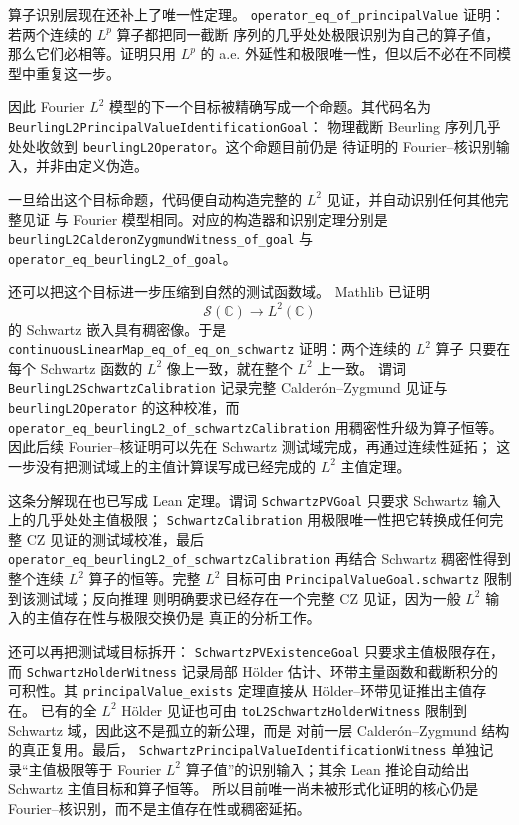\documentclass[UTF8,fontset=none,a4paper,11pt]{ctexart}
\begin{document}
算子识别层现在还补上了唯一性定理。
\texttt{operator\_eq\_of\_principalValue} 证明：若两个连续的 \(L^p\) 算子都把同一截断
序列的几乎处处极限识别为自己的算子值，那么它们必相等。证明只用 \(L^p\) 的 a.e.
外延性和极限唯一性，但以后不必在不同模型中重复这一步。\par

{\small
因此 Fourier \(L^2\) 模型的下一个目标被精确写成一个命题。其代码名为
\texttt{BeurlingL2PrincipalValue}\allowbreak\texttt{IdentificationGoal}：
物理截断 Beurling 序列几乎处处收敛到 \texttt{beurlingL2Operator}。这个命题目前仍是
待证明的 Fourier--核识别输入，并非由定义伪造。\par

一旦给出这个目标命题，代码便自动构造完整的 \(L^2\) 见证，并自动识别任何其他完整见证
与 Fourier 模型相同。对应的构造器和识别定理分别是
\texttt{beurlingL2CalderonZygmundWitness}\allowbreak\texttt{\_of\_goal} 与
\texttt{operator\_eq\_beurlingL2}\allowbreak\texttt{\_of\_goal}。\par
}

还可以把这个目标进一步压缩到自然的测试函数域。
Mathlib 已证明
\[
 \mathcal S(\mathbb C)\longrightarrow L^2(\mathbb C)
\]
的 Schwartz 嵌入具有稠密像。于是
\texttt{continuousLinearMap\_eq\_of\_eq\_on\_schwartz} 证明：两个连续的 \(L^2\) 算子
只要在每个 Schwartz 函数的 \(L^2\) 像上一致，就在整个 \(L^2\) 上一致。
谓词 \texttt{BeurlingL2SchwartzCalibration} 记录完整 Calderón--Zygmund 见证与
\texttt{beurlingL2Operator} 的这种校准，而
\texttt{operator\_eq\_beurlingL2\_of\_schwartzCalibration} 用稠密性升级为算子恒等。
因此后续 Fourier--核证明可以先在 Schwartz 测试域完成，再通过连续性延拓；
这一步没有把测试域上的主值计算误写成已经完成的 \(L^2\) 主值定理。\par

这条分解现在也已写成 Lean 定理。谓词
\texttt{SchwartzPVGoal} 只要求 Schwartz 输入上的几乎处处主值极限；
\texttt{SchwartzCalibration} 用极限唯一性把它转换成任何完整 CZ 见证的测试域校准，最后
\texttt{operator\_eq\_beurlingL2\_of\_schwartzCalibration} 再结合 Schwartz 稠密性得到
整个连续 \(L^2\) 算子的恒等。完整 \(L^2\) 目标可由
\texttt{PrincipalValueGoal.schwartz} 限制到该测试域；反向推理
则明确要求已经存在一个完整 CZ 见证，因为一般 \(L^2\) 输入的主值存在性与极限交换仍是
真正的分析工作。\par

还可以再把测试域目标拆开：
\texttt{SchwartzPVExistenceGoal} 只要求主值极限存在，
而 \texttt{SchwartzHolderWitness} 记录局部 Hölder 估计、环带主量函数和截断积分的
可积性。其 \texttt{principalValue\_exists} 定理直接从 Hölder--环带见证推出主值存在。
已有的全 $L^2$ Hölder 见证也可由
\texttt{toL2SchwartzHolderWitness} 限制到 Schwartz 域，因此这不是孤立的新公理，而是
对前一层 Calderón--Zygmund 结构的真正复用。最后，
\texttt{SchwartzPrincipalValueIdentificationWitness} 单独记录“主值极限等于
Fourier $L^2$ 算子值”的识别输入；其余 Lean 推论自动给出 Schwartz 主值目标和算子恒等。
所以目前唯一尚未被形式化证明的核心仍是 Fourier--核识别，而不是主值存在性或稠密延拓。\par
\end{document}
